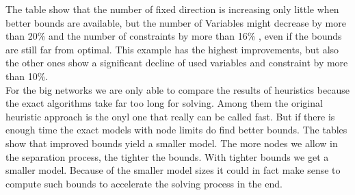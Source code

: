 The table show that the number of fixed direction is increasing only little when better bounds are available, but the 
number of Variables might decrease by more than 20\% and the number of constraints by more than 16\% , even if the 
bounds are still far from optimal. This example has the highest improvements, but also the other ones show a 
significant decline of used variables and constraint by more than 10\%.\\


For the big networks we are only able to compare the results of heuristics because the exact algorithms take far 
too long for solving. Among them the original heuristic approach is the onyl one that really can be called fast. But if 
there is enough time the exact models with node limits do find better bounds. The tables show that improved bounds 
yield a smaller model. The more nodes we allow in the 
separation process, the tighter the bounds. With tighter bounds we get a smaller model. Because of the smaller model 
sizes it could in fact make sense to compute such bounds to accelerate the solving process in the end. 
